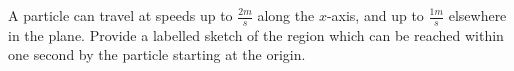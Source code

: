 A particle can travel at speeds up to $ \frac{2m}{s}$ along the $ x$-axis, and up to $ \frac{1m}{s}$ elsewhere in the plane. Provide a labelled sketch of the region which can be reached within one second by the particle starting at the origin.